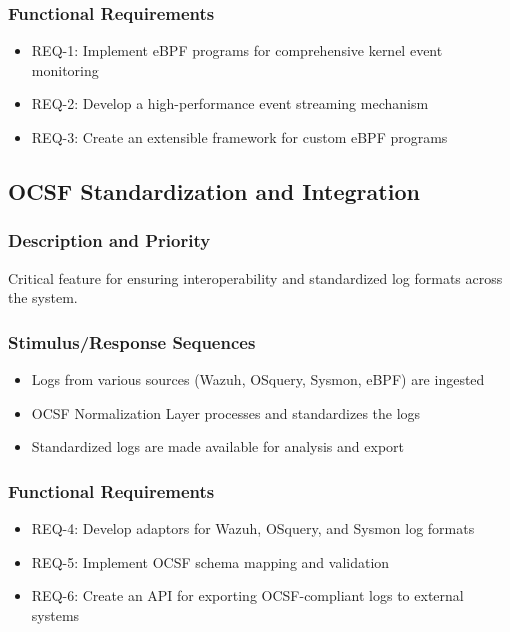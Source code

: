 \subsubsection{Functional Requirements}
\begin{itemize}
    \item REQ-1: Implement eBPF programs for comprehensive kernel event monitoring
    \item REQ-2: Develop a high-performance event streaming mechanism
    \item REQ-3: Create an extensible framework for custom eBPF programs
\end{itemize}

\subsection{OCSF Standardization and Integration}
\subsubsection{Description and Priority}
Critical feature for ensuring interoperability and standardized log formats across the system.

\subsubsection{Stimulus/Response Sequences}
\begin{itemize}
    \item Logs from various sources (Wazuh, OSquery, Sysmon, eBPF) are ingested
    \item OCSF Normalization Layer processes and standardizes the logs
    \item Standardized logs are made available for analysis and export
\end{itemize}

\subsubsection{Functional Requirements}
\begin{itemize}
    \item REQ-4: Develop adaptors for Wazuh, OSquery, and Sysmon log formats
    \item REQ-5: Implement OCSF schema mapping and validation
    \item REQ-6: Create an API for exporting OCSF-compliant logs to external systems
\end{itemize}

